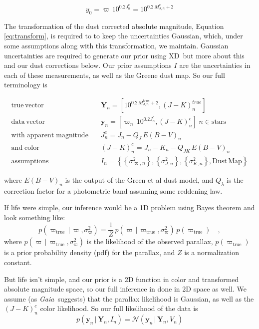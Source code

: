 \documentclass[modern]{aastex61}
\newcommand{\acronym}[1]{{\small{#1}}}
\newcommand{\project}[1]{\textsl{#1}}
\newcommand{\gaia}{\project{Gaia}}
\newcommand{\xd}{\acronym{XD}}
\newcommand{\given}{\,|\,}
\newcommand{\true}{\mathrm{true}}
\begin{document}
\begin{equation}
y_0 = \varpi\,10^{0.2J^c_n} = 10^{0.2\,M^c_{J,n} + 2}
\label{eq:transform}
\end{equation}

The transformation of the dust corrected absolute magnitude, Equation \ref{eq:transform}, is required to to keep the uncertainties Gaussian, which, under some assumptions along with this transformation, we maintain. Gaussian uncertainties are required to generate our prior using \xd\, but more about this and our dust corrections below.
Our prior assumptions $I$ are the uncertainties in each of these measurements, as well as the Greene dust map. So our full terminology is

\begin{equation}
\begin{aligned}
\mathrm{true \, vector} \quad &\mathbf{Y}_n = [10^{0.2\,M^{true}_{J,n} + 2}, (J-K)^{true}_n] \\
\mathrm{data \, vector} \quad &\mathbf{y}_n = [\varpi_n\,10^{0.2J^c_n}, (J- K)^c_n] \;  n \in \mathrm{stars} \\
\mathrm{with \; apparent \; magnitude} \quad &J^c_n = J_n - Q_J\,E(B-V)_n \\
\mathrm{and \; color} \quad &(J - K)^c_n = J_n - K_n - Q_{JK}\,E(B-V)_n \\
\mathrm{assumptions} \quad &I_n = \left\{\left\{\sigma^2_{\varpi, n}\right\}, \left\{\sigma^2_{J,n}\right\}, \left\{\sigma^2_{K,n}\right\}, \mathrm{Dust \, Map}\right\}
\end{aligned}
\label{eq:data}
\end{equation}

where $E(B-V)_n$ is the output of the Green et al dust model, and $Q_{\lambda}$ is the correction factor for a photometric band assuming some reddening law.

If life were simple, our inference would be a 1D problem using Bayes theorem and look something like:
\begin{equation}
p(\varpi_{\true} \given \varpi, \sigma^2_{\varpi}) = \frac{1}{Z}\,p(\varpi \given \varpi_{\true}, \sigma^2_{\varpi}) \, p(\varpi_{\true}) \quad ,
\label{eq:bayes}
\end{equation}
where $p(\varpi \given \varpi_{\true}, \sigma^2_{\varpi})$ is the likelihood of the observed parallax, $p(\varpi_{\true})$ is a prior probability density (pdf) for the
parallax, and $Z$ is a normalization constant.

But life isn't simple, and our prior is a 2D function in color and transformed absolute magnitude space, so our full inference in done in 2D space as well.
We assume (as \gaia\ suggests) that the parallax likelihood is Gaussian, as well as the $(J-K)^c_n$ color likelihood. So our full likelihood of the data is
\begin{equation}
p(\mathbf{y}_n \given \mathbf{Y}_n, I_n) = \mathcal{N}(\mathbf{y}_n \given \mathbf{Y}_n, V_n)
\end{equation}
\end{document}
